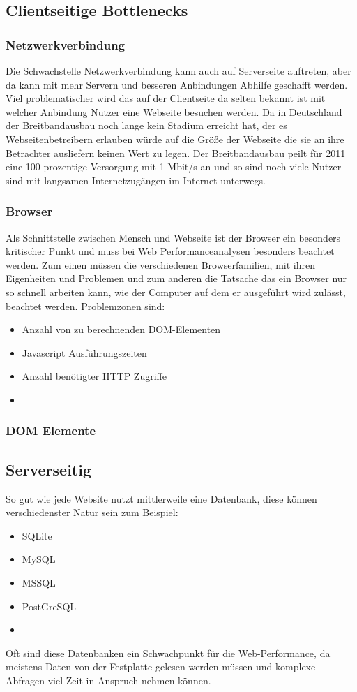 \subsection{Clientseitige Bottlenecks}
\subsubsection{Netzwerkverbindung}Die Schwachstelle Netzwerkverbindung kann auch auf Serverseite auftreten, aber da kann mit mehr Servern und besseren Anbindungen Abhilfe geschafft werden. Viel problematischer wird das auf der Clientseite da selten bekannt ist mit welcher Anbindung Nutzer eine Webseite besuchen werden.%
Da in Deutschland der Breitbandausbau noch lange kein Stadium erreicht hat, der es Webseitenbetreibern erlauben würde auf die Größe der Webseite die sie an ihre Betrachter ausliefern keinen Wert zu legen. Der Breitbandausbau peilt für 2011 eine 100 prozentige Versorgung mit 1 Mbit/s an und so sind noch viele Nutzer sind mit langsamen Internetzugängen im Internet unterwegs. 

\subsubsection{Browser}
Als Schnittstelle zwischen Mensch und Webseite ist der Browser ein besonders kritischer Punkt und muss bei Web Performanceanalysen besonders beachtet werden. Zum einen müssen die verschiedenen Browserfamilien, mit ihren Eigenheiten und Problemen und zum anderen die Tatsache das ein Browser nur so schnell arbeiten kann, wie der Computer auf dem er ausgeführt wird zulässt, beachtet werden. Problemzonen sind:
\begin{itemize}
  \item Anzahl von zu berechnenden DOM-Elementen
  \item Javascript Ausführungszeiten
  \item Anzahl benötigter HTTP Zugriffe
  \item 

\end{itemize}

\subsubsection{DOM Elemente}
\subsection{Serverseitig}
So gut wie jede Website nutzt mittlerweile eine Datenbank, diese können verschiedenster Natur sein zum Beispiel:
\begin{itemize}
\item SQLite
\item MySQL
\item MSSQL
\item PostGreSQL
\item 
\end{itemize}
Oft sind diese Datenbanken ein Schwachpunkt für die Web-Performance, da meistens Daten von der Festplatte gelesen werden müssen und komplexe Abfragen viel Zeit in Anspruch nehmen können.
